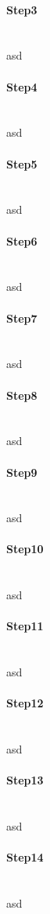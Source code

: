 \documentclass[a4paper, 11pt]{scrartcl}
\begin{document}
\paragraph{Step3}\hfill \\ 
asd
\paragraph{Step4}\hfill \\ 
asd
\paragraph{Step5}\hfill \\ 
asd
\paragraph{Step6}\hfill \\ 
asd
\paragraph{Step7}\hfill \\ 
asd
\paragraph{Step8}\hfill \\ 
asd
\paragraph{Step9}\hfill \\ 
asd
\paragraph{Step10}\hfill \\ 
asd
\paragraph{Step11}\hfill \\ 
asd
\paragraph{Step12}\hfill \\ 
asd
\paragraph{Step13}\hfill \\ 
asd
\paragraph{Step14}\hfill \\ 
asd
\end{document}
